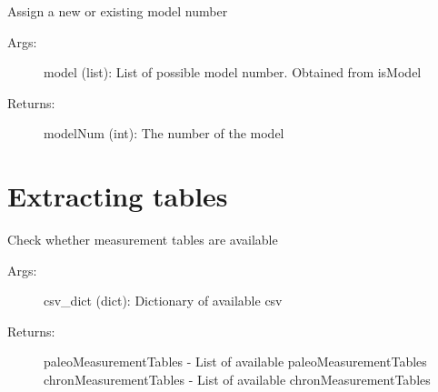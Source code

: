 \documentclass[letterpaper,10pt,english]{sphinxmanual}
\begin{document}

\begin{fulllineitems}
\label{\detokenize{LIPDutils:pyleoclim.LipdUtils.modelNumber}}
Assign a new or existing model number
\begin{description}
\item[{Args:}] \leavevmode
model (list): List of possible model number. Obtained from isModel

\item[{Returns:}] \leavevmode
modelNum (int): The number of the model

\end{description}

\end{fulllineitems}



\section{Extracting tables}
\label{\detokenize{LIPDutils:extracting-tables}}

\begin{fulllineitems}
\label{\detokenize{LIPDutils:pyleoclim.LipdUtils.isMeasurement}}
Check whether measurement tables are available
\begin{description}
\item[{Args:}] \leavevmode
csv\_dict (dict): Dictionary of available csv

\item[{Returns:}] \leavevmode
paleoMeasurementTables - List of available paleoMeasurementTables
chronMeasurementTables - List of available chronMeasurementTables

\end{description}

\end{fulllineitems}

\end{document}
